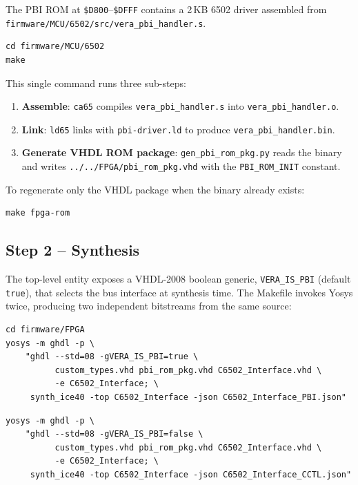 \documentclass[11pt,a4paper]{article}
\newcommand{\cmd}[1]{\texttt{#1}}
\newcommand{\file}[1]{\texttt{#1}}
\newcommand{\hex}[1]{\texttt{\$#1}}
\begin{document}
The PBI ROM at \hex{D800}--\hex{DFFF} contains a 2\,KB 6502 driver
assembled from \file{firmware/MCU/6502/src/vera\_pbi\_handler.s}.

\begin{lstlisting}[style=shell,caption={Assemble the 6502 driver}]
cd firmware/MCU/6502
make
\end{lstlisting}

This single command runs three sub-steps:

\begin{enumerate}[noitemsep]
    \item \textbf{Assemble}: \cmd{ca65} compiles
          \file{vera\_pbi\_handler.s} into \file{vera\_pbi\_handler.o}.
    \item \textbf{Link}: \cmd{ld65} links with \file{pbi-driver.ld}
          to produce \file{vera\_pbi\_handler.bin}.
    \item \textbf{Generate VHDL ROM package}: \file{gen\_pbi\_rom\_pkg.py}
          reads the binary and writes
          \file{../../FPGA/pbi\_rom\_pkg.vhd} with the
          \cmd{PBI\_ROM\_INIT} constant.
\end{enumerate}

To regenerate only the VHDL package when the binary already exists:

\begin{lstlisting}[style=shell]
make fpga-rom
\end{lstlisting}

\subsection{Step 2 -- Synthesis}

The top-level entity exposes a VHDL-2008 boolean generic,
\cmd{VERA\_IS\_PBI} (default \cmd{true}), that selects the bus interface
at synthesis time.  The Makefile invokes Yosys twice, producing two
independent bitstreams from the same source:

\begin{lstlisting}[style=shell,caption={PBI synthesis (VERA\_IS\_PBI=true)}]
cd firmware/FPGA
yosys -m ghdl -p \
    "ghdl --std=08 -gVERA_IS_PBI=true \
          custom_types.vhd pbi_rom_pkg.vhd C6502_Interface.vhd \
          -e C6502_Interface; \
     synth_ice40 -top C6502_Interface -json C6502_Interface_PBI.json"
\end{lstlisting}

\begin{lstlisting}[style=shell,caption={CCTL synthesis (VERA\_IS\_PBI=false)}]
yosys -m ghdl -p \
    "ghdl --std=08 -gVERA_IS_PBI=false \
          custom_types.vhd pbi_rom_pkg.vhd C6502_Interface.vhd \
          -e C6502_Interface; \
     synth_ice40 -top C6502_Interface -json C6502_Interface_CCTL.json"
\end{lstlisting}
\end{document}
